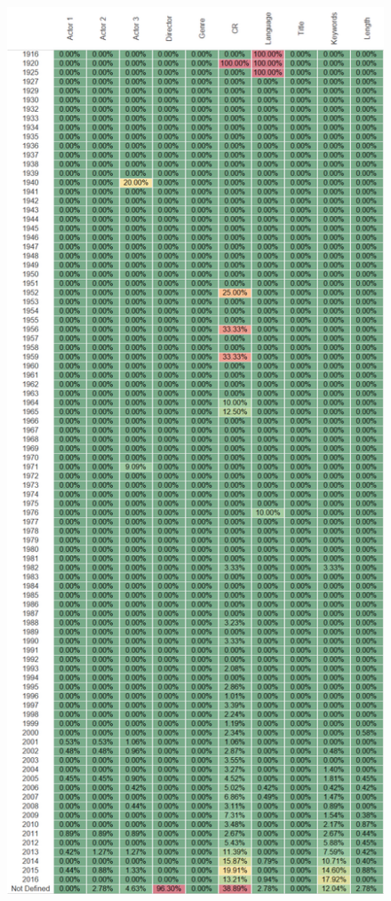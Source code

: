 \documentclass{article}
\begin{document}
\begin{figure}[h]
\centering
\includegraphics[height=0.78\textheight,clip,keepaspectratio]{./images_latex/dataset_quality_dimensions}
\label{fig:imdb_num_films_per_year}
\end{figure}
\end{document}
